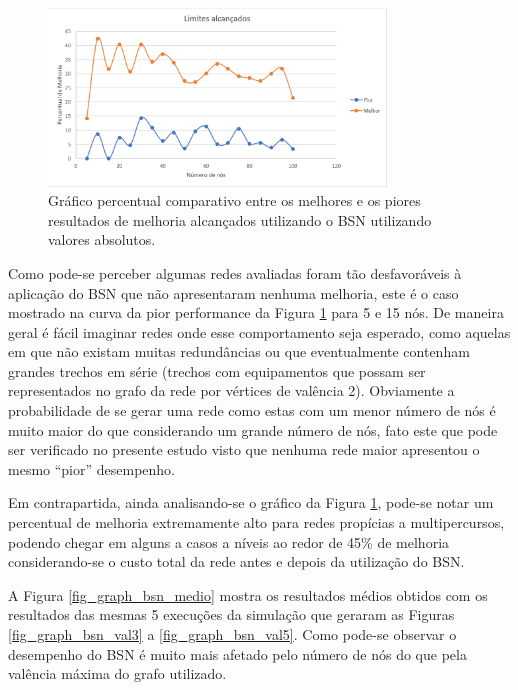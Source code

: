 \begin{figure} [ht]%
	\centering
	\includegraphics[width=0.8\textwidth]{./figuras/BSN-pior-melhor-exec.png} %
	\caption[Limites de melhoria alcançados]{Gráfico percentual comparativo entre os melhores e os piores resultados de melhoria alcançados utilizando o BSN utilizando valores absolutos.}
	\label{fig_graph_bsn_pior_melhor}
\end{figure}

Como pode-se perceber algumas redes avaliadas foram tão desfavoráveis à aplicação do BSN que não apresentaram nenhuma melhoria, este é o caso mostrado na curva da pior performance da Figura \ref{fig_graph_bsn_pior_melhor} para 5 e 15 nós. De maneira geral é fácil imaginar redes onde esse comportamento seja esperado, como aquelas em que não existam muitas redundâncias ou que eventualmente contenham grandes trechos em série (trechos com equipamentos que possam ser representados no grafo da rede por vértices de valência 2). Obviamente a probabilidade de se gerar uma rede como estas com um menor número de nós é muito maior do que considerando um grande número de nós, fato este que pode ser verificado no presente estudo visto que nenhuma rede maior apresentou o mesmo ``pior'' desempenho.

Em contrapartida, ainda analisando-se o gráfico da Figura \ref{fig_graph_bsn_pior_melhor}, pode-se notar um percentual de melhoria extremamente alto para redes propícias a multipercursos, podendo chegar em alguns a casos a níveis ao redor de 45\% de melhoria considerando-se o custo total da rede antes e depois da utilização do BSN. %

A Figura \ref{fig_graph_bsn_medio} mostra os resultados médios obtidos com os resultados das mesmas 5 execuções da simulação que geraram as Figuras \ref{fig_graph_bsn_val3} a \ref{fig_graph_bsn_val5}. Como pode-se observar o desempenho do BSN é muito mais afetado pelo número de nós do que pela valência máxima do grafo utilizado.

